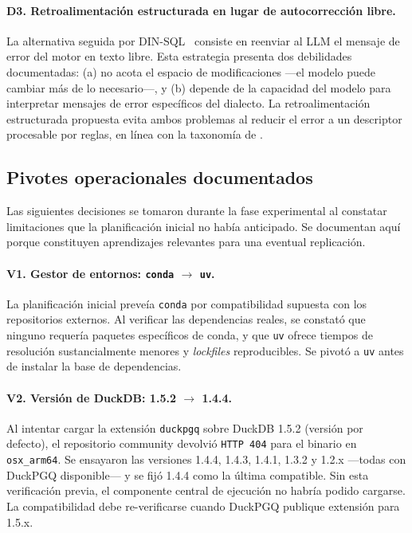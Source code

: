 \paragraph{D3. Retroalimentación estructurada en lugar de autocorrección libre.} La alternativa seguida por \textsc{DIN-SQL}~\cite{DIN-SQL2023} consiste en reenviar al \ac{LLM} el mensaje de error del motor en texto libre. Esta estrategia presenta dos debilidades documentadas: (a) no acota el espacio de modificaciones ---el modelo puede cambiar más de lo necesario---, y (b) depende de la capacidad del modelo para interpretar mensajes de error específicos del dialecto. La retroalimentación estructurada propuesta evita ambos problemas al reducir el error a un descriptor procesable por reglas, en línea con la taxonomía de \cite{errorllm2026}.

\subsection{Pivotes operacionales documentados}

Las siguientes decisiones se tomaron durante la fase experimental al constatar limitaciones que la planificación inicial no había anticipado. Se documentan aquí porque constituyen aprendizajes relevantes para una eventual replicación.

\paragraph{V1. Gestor de entornos: \texttt{conda} $\to$ \texttt{uv}.} La planificación inicial preveía \texttt{conda} por compatibilidad supuesta con los repositorios externos. Al verificar las dependencias reales, se constató que ninguno requería paquetes específicos de conda, y que \texttt{uv} ofrece tiempos de resolución sustancialmente menores y \emph{lockfiles} reproducibles. Se pivotó a \texttt{uv} antes de instalar la base de dependencias.

\paragraph{V2. Versión de DuckDB: 1.5.2 $\to$ 1.4.4.} Al intentar cargar la extensión \texttt{duckpgq} sobre DuckDB 1.5.2 (versión por defecto), el repositorio community devolvió \texttt{HTTP 404} para el binario en \texttt{osx\_arm64}. Se ensayaron las versiones 1.4.4, 1.4.3, 1.4.1, 1.3.2 y 1.2.x ---todas con DuckPGQ disponible--- y se fijó 1.4.4 como la última compatible. Sin esta verificación previa, el componente central de ejecución no habría podido cargarse. La compatibilidad debe re-verificarse cuando DuckPGQ publique extensión para 1.5.x.

